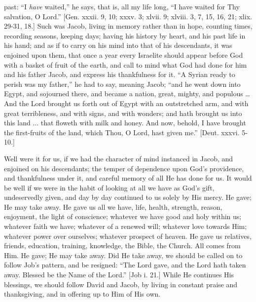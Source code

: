 past: ``I \emph{have} waited,'' he says, that is, all my life
long, ``I have waited for Thy salvation, O Lord.'' [Gen. xxxii.
9, 10; xxxv. 3; xlvii. 9; xlviii. 3, 7, 15, 16, 21; xlix. 29-31, 18.]
Such was Jacob, living in memory rather than in hope, counting times,
recording seasons, keeping days; having his history by heart, and his
past life in his hand; and as if to carry on his mind into that of his
descendants, it was enjoined upon them, that once a year every
Israelite should appear before God with a basket of fruit of the
earth, and call to mind what God had done for him and his father
Jacob, and express his thankfulness for it. ``A Syrian ready to
perish was my father,'' he had to say, meaning Jacob; ``and he
went down into Egypt, and sojourned there, and became a nation, great,
mighty, and populous … And the Lord brought us forth out of Egypt
with an outstretched arm, and with great terribleness, and with signs,
and with wonders; and hath brought us into this land ... that floweth
with milk and honey. And now, behold, I have brought the first-fruits
of the land, which Thou, O Lord, hast given me.'' [Deut. xxxvi.
5-10.]

Well were it for us, if we had the character of mind instanced in
Jacob, and enjoined on his descendants; the temper of dependence upon
God's providence, and thankfulness under it, and careful memory of all
He has done for us. It would be well if we were in the habit of
looking at all we have as God's gift, undeservedly given, and day by
day continued to us solely by His mercy. He gave; He may take away. He
gave us all we have, life, health, strength, reason, enjoyment, the
light of conscience; whatever we have good and holy within us;
whatever faith we have; whatever of a renewed will; whatever love
towards Him; whatever power over ourselves; whatever prospect of
heaven. He gave us relatives, friends, education, training, knowledge,
the Bible, the Church. All comes from Him. He gave; He may take away.
Did He take away, we should be called on to follow Job's pattern, and
be resigned: ``The Lord gave, and the Lord hath taken away.
Blessed be the Name of the Lord.'' [Job i. 21.] While He continues
His blessings, we should follow David and Jacob, by living in constant
praise and thanksgiving, and in offering up to Him of His own.

